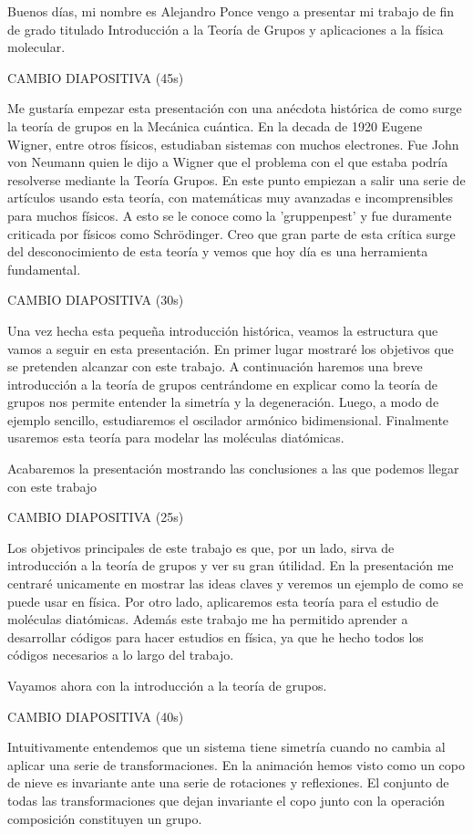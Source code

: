 \documentclass[a4paper,12pt,twoside]{article}
\author{Alejandro Ponce Miguela\\
\\
\normalsize{Grado en Física }\\
}
\date{}
\date{}
\title{}
\begin{document}
Buenos días, mi nombre es Alejandro Ponce vengo a presentar mi trabajo de fin de grado titulado Introducción a la Teoría de Grupos y aplicaciones a la física molecular. 

CAMBIO DIAPOSITIVA (45s)

Me gustaría empezar esta presentación con una anécdota histórica de como surge la teoría de grupos en la Mecánica cuántica. En la decada de 1920 Eugene Wigner, entre otros físicos, estudiaban sistemas con muchos electrones. Fue John von Neumann quien le dijo a Wigner que el problema con el que estaba podría resolverse mediante la Teoría Grupos. En este punto empiezan a salir una serie de artículos usando esta teoría, con matemáticas muy avanzadas e incomprensibles para muchos físicos. A esto se le conoce como la 'gruppenpest' y fue duramente criticada por físicos como Schrödinger. Creo que gran parte de esta crítica surge del desconocimiento de esta teoría y vemos que hoy día es una herramienta fundamental.

CAMBIO DIAPOSITIVA (30s)

Una vez hecha esta pequeña introducción histórica, veamos la estructura que vamos a seguir en esta presentación. En primer lugar mostraré los objetivos que se pretenden alcanzar con este trabajo. A continuación haremos una breve introducción a la teoría de grupos centrándome en explicar como la teoría de grupos nos permite entender la simetría y la degeneración. Luego, a modo de ejemplo sencillo, estudiaremos el oscilador armónico bidimensional. Finalmente usaremos esta teoría para modelar las moléculas diatómicas. 

Acabaremos la presentación mostrando las conclusiones a las que podemos llegar con este trabajo

CAMBIO DIAPOSITIVA (25s)

Los objetivos principales de este trabajo es que, por un lado, sirva de introducción a la teoría de grupos y ver su gran útilidad. En la presentación me centraré unicamente en mostrar las ideas claves y veremos un ejemplo de como se puede usar en física. Por otro lado, aplicaremos esta teoría para el estudio de moléculas diatómicas. Además este trabajo me ha permitido aprender a desarrollar códigos para hacer estudios en física, ya que he hecho todos los códigos necesarios a lo largo del trabajo.

Vayamos ahora con la introducción a la teoría de grupos.

CAMBIO DIAPOSITIVA (40s)

Intuitivamente entendemos que un sistema tiene simetría cuando no cambia al aplicar una serie de transformaciones. En la animación hemos visto como un copo de nieve es invariante ante una serie de rotaciones y reflexiones. El conjunto de todas las transformaciones que dejan invariante el copo junto con la operación composición constituyen un grupo. 
\end{document}
